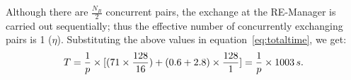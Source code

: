 \documentclass{rspublic}
\newcommand{\jhanote}[1]{ {\textcolor{red} { ***shantenu: #1 }}}
\newcommand{\alnote}[1]{ {\textcolor{blue} { ***andre: #1 }}}
\newcommand{\athotanote}[1]{ {\textcolor{green} { ***athota: #1 }}}
\newcommand{\alnote}[1]{}
\newcommand{\athotanote}[1]{}
\newcommand{\jhanote}[1]{}
\begin{document}
Although there are $\frac{N_R}{2}$ concurrent pairs, the exchange 
at the RE-Manager is carried out sequentially; thus the effective 
number of concurrently exchanging pairs is 1 ($\eta$). 
Substituting the above values in equation~\ref{eq:totaltime}, we get:
\begin{eqnarray}
  T=  {1 \over p} \times {[ {(71\times {128\over 16}})+ (0.6 + 2.8)\times {128 \over 1}]} = {1 \over p} \times 1003\,s.
  \label{eq:sync}
\end{eqnarray}





\end{document}
